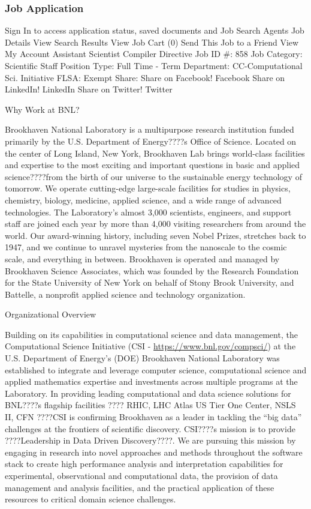 \begin{frame}[label=jobApp] 
\frametitle{Job Application} 

{\tiny Sign In to access application status,
saved documents and Job Search Agents
Job Details
View Search Results
View Job Cart (0)
Send This Job to a Friend
View My Account
Assistant Scientist Compiler Directive
Job ID \#: 858 Job Category: Scientific Staff
Position Type: Full Time - Term Department: CC-Computational
Sci. Initiative
FLSA: Exempt  
Share: Share on Facebook! Facebook Share on LinkedIn! LinkedIn Share on Twitter! Twitter

Why Work at BNL?

Brookhaven National Laboratory is a multipurpose research institution
funded primarily by the U.S. Department of Energy????s Office of
Science. Located on the center of Long Island, New York, Brookhaven
Lab brings world-class facilities and expertise to the most exciting
and important questions in basic and applied science????from the birth of
our universe to the sustainable energy technology of tomorrow. We
operate cutting-edge large-scale facilities for studies in physics,
chemistry, biology, medicine, applied science, and a wide range of
advanced technologies. The Laboratory's almost 3,000 scientists,
engineers, and support staff are joined each year by more than 4,000
visiting researchers from around the world. Our award-winning history,
including seven Nobel Prizes, stretches back to 1947, and we continue
to unravel mysteries from the nanoscale to the cosmic scale, and
everything in between. Brookhaven is operated and managed by
Brookhaven Science Associates, which was founded by the Research
Foundation for the State University of New York on behalf of Stony
Brook University, and Battelle, a nonprofit applied science and
technology organization.

Organizational Overview

Building on its capabilities in computational science and data
management, the Computational Science Initiative (CSI -
\url{https://www.bnl.gov/compsci/}) at the U.S. Department of Energy's (DOE)
Brookhaven National Laboratory was established to integrate and
leverage computer science, computational science and applied
mathematics expertise and investments across multiple programs at the
Laboratory. In providing leading computational and data science
solutions for BNL????s flagship facilities ???? RHIC, LHC Atlas US Tier One
Center, NSLS II, CFN ????CSI is confirming Brookhaven as a leader in
tackling the ``big data'' challenges at the frontiers of scientific
discovery. CSI????s mission is to provide ????Leadership in Data Driven
Discovery????. We are pursuing this mission by engaging in research into
novel approaches and methods throughout the software stack to create
high performance analysis and interpretation capabilities for
experimental, observational and computational data, the provision of
data management and analysis facilities, and the practical application
of these resources to critical domain science challenges.

}
\end{frame}
